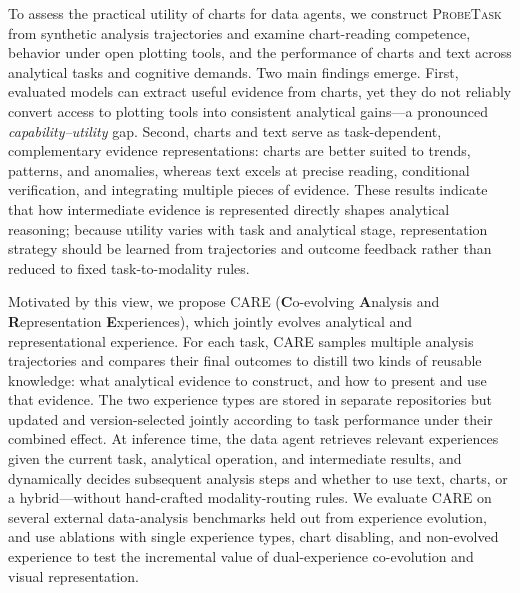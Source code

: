 \documentclass{article}
\newcommand{\method}{\textsc{CARE}}
\newcommand{\probe}{\textsc{ProbeTask}}
\begin{document}
To assess the practical utility of charts for data agents, we construct \probe{} from synthetic analysis trajectories and examine chart-reading competence, behavior under open plotting tools, and the performance of charts and text across analytical tasks and cognitive demands.
Two main findings emerge.
First, evaluated models can extract useful evidence from charts, yet they do not reliably convert access to plotting tools into consistent analytical gains---a pronounced \emph{capability--utility} gap.
Second, charts and text serve as task-dependent, complementary evidence representations: charts are better suited to trends, patterns, and anomalies, whereas text excels at precise reading, conditional verification, and integrating multiple pieces of evidence.
These results indicate that how intermediate evidence is represented directly shapes analytical reasoning; because utility varies with task and analytical stage, representation strategy should be learned from trajectories and outcome feedback rather than reduced to fixed task-to-modality rules.

Motivated by this view, we propose \method{} (\textbf{C}o-evolving \textbf{A}nalysis and \textbf{R}epresentation \textbf{E}xperiences), which jointly evolves analytical and representational experience.
For each task, \method{} samples multiple analysis trajectories and compares their final outcomes to distill two kinds of reusable knowledge: what analytical evidence to construct, and how to present and use that evidence.
The two experience types are stored in separate repositories but updated and version-selected jointly according to task performance under their combined effect.
At inference time, the data agent retrieves relevant experiences given the current task, analytical operation, and intermediate results, and dynamically decides subsequent analysis steps and whether to use text, charts, or a hybrid---without hand-crafted modality-routing rules.
We evaluate \method{} on several external data-analysis benchmarks held out from experience evolution, and use ablations with single experience types, chart disabling, and non-evolved experience to test the incremental value of dual-experience co-evolution and visual representation.
\end{document}
